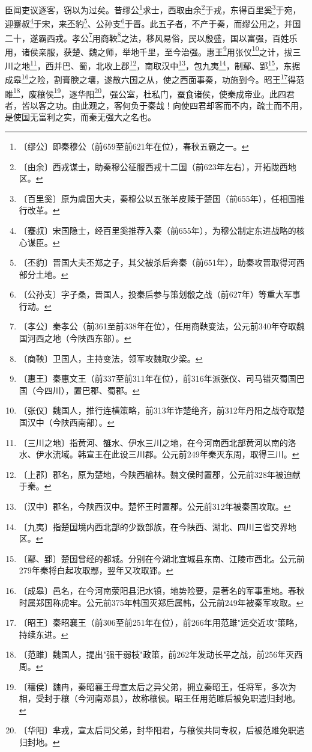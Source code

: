 \documentclass[12pt,UTF-8,openany]{ctexbook}
\begin{document}
\begin{normalsize}
    
    臣闻吏议逐客，窃以为过矣。昔缪公\footnote{〔缪公〕即秦穆公（前659至前621年在位），春秋五霸之一。}求士，西取由余\footnote{〔由余〕西戎谋士，助秦穆公征服西戎十二国（前623年左右），开拓陇西地区。}于戎，东得百里奚\footnote{〔百里奚〕原为虞国大夫，秦穆公以五张羊皮赎于楚国（前655年），任相国推行改革。}于宛，迎蹇叔\footnote{〔蹇叔〕宋国隐士，经百里奚推荐入秦（前655年），为穆公制定东进战略的核心谋臣。}于宋，来丕豹\footnote{〔丕豹〕晋国大夫丕郑之子，其父被杀后奔秦（前651年），助秦攻晋取得河西部分土地。}、公孙支\footnote{〔公孙支〕字子桑，晋国人，投秦后参与策划殽之战（前627年）等重大军事行动。}于晋。此五子者，不产于秦，而缪公用之，并国二十，遂霸西戎。孝公\footnote{〔孝公〕秦孝公（前361至前338年在位），任用商鞅变法，公元前340年夺取魏国河西之地（今陕西东部）。}用商鞅\footnote{〔商鞅〕卫国人，主持变法，领军攻魏取少梁。}之法，移风易俗，民以殷盛，国以富强，百姓乐用，诸侯亲服，获楚、魏之师，举地千里，至今治强。惠王\footnote{〔惠王〕秦惠文王（前337至前311年在位），前316年派张仪、司马错灭蜀国巴国（今四川），置巴郡、蜀郡。}用张仪\footnote{〔张仪〕魏国人，推行连横策略，前313年诈楚绝齐，前312年丹阳之战夺取楚国汉中（今陕西南部）。}之计，拔三川之地\footnote{〔三川之地〕指黄河、雒水、伊水三川之地，在今河南西北部黄河以南的洛水、伊水流域。韩宣王在此设三川郡。公元前249年秦灭东周，取得三川。}，西并巴、蜀，北收上郡\footnote{〔上郡〕郡名，原为楚地，今陕西榆林。魏文侯时置郡，公元前328年被迫献于秦。}，南取汉中\footnote{〔汉中〕郡名，今陕西汉中。楚怀王时置郡。公元前312年被秦国攻取。}，包九夷\footnote{〔九夷〕指楚国境内西北部的少数部族，在今陕西、湖北、四川三省交界地区。}，制鄢、郢\footnote{〔鄢、郢〕楚国曾经的都城。分别在今湖北宜城县东南、江陵市西北。公元前279年秦将白起攻取鄢，翌年又攻取郢。}，东据成皋\footnote{〔成皋〕邑名，在今河南荥阳县汜水镇，地势险要，是著名的军事重地。春秋时属郑国称虎牢。公元前375年韩国灭郑后属韩，公元前249年被秦军攻取。}之险，割膏腴之壤，遂散六国之从，使之西面事秦，功施到今。昭王\footnote{〔昭王〕秦昭襄王（前306至前251年在位），前266年用范雎"远交近攻"策略，持续东进。}得范雎\footnote{〔范雎〕魏国人，提出"强干弱枝"政策，前262年发动长平之战，前256年灭西周。}，废穰侯\footnote{〔穰侯〕魏冉，秦昭襄王母宣太后之异父弟，拥立秦昭王，任将军，多次为相，受封于穰（今河南邓县），故称穰侯。昭王任用范雎后被免职遣归封地。}，逐华阳\footnote{〔华阳〕芈戎，宣太后同父弟，封华阳君，与穰侯共同专权，后被范雎免职遣归封地。}，强公室，杜私门，蚕食诸侯，使秦成帝业。此四君者，皆以客之功。由此观之，客何负于秦哉！向使四君却客而不内，疏士而不用，是使国无富利之实，而秦无强大之名也。
    

\end{normalsize}
\end{document}
